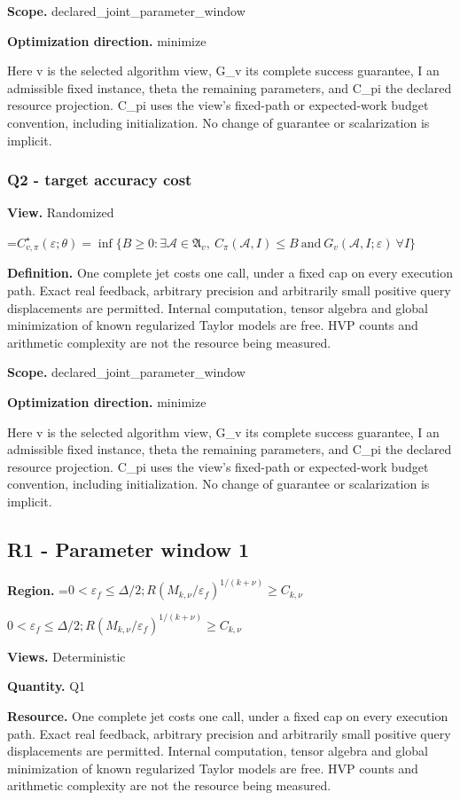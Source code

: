 \documentclass[10pt,a4paper]{article}
\newcommand{\AtlasMath}[1]{\par\begingroup\centering\setbox0=\hbox{$\displaystyle #1$}\ifdim\wd0>1.4\linewidth\typeout{ATLAS WIDE FORMULA: \the\wd0}\fi\ifdim\wd0>\linewidth\resizebox{\linewidth}{!}{\box0}\else\box0\fi\par\endgroup}
\newcommand{\AtlasInlineMath}[1]{\begingroup\setbox0=\hbox{$#1$}\ifdim\wd0>.4\linewidth\endgroup\AtlasMath{#1}\else\endgroup$#1$\fi}
\begin{document}
\textbf{Scope.} declared\_joint\_parameter\_window

\textbf{Optimization direction.} minimize

Here v is the selected algorithm view, G\_v its complete success guarantee, I an admissible fixed instance, theta the remaining parameters, and C\_pi the declared resource projection. C\_pi uses the view's fixed-path or expected-work budget convention, including initialization. No change of guarantee or scalarization is implicit.

\subsubsection{Q2 - target accuracy cost}
\textbf{View.} Randomized

\AtlasMath{C^\star_{v,\pi}(\varepsilon;\theta)=\inf\{B\ge0:\exists\mathcal A\in\mathfrak A_v,\ C_\pi(\mathcal A,I)\le B\ \text{and}\ G_v(\mathcal A,I;\varepsilon)\ \forall I\}}
\textbf{Definition.} One complete jet costs one call, under a fixed cap on every execution path. Exact real feedback, arbitrary precision and arbitrarily small positive query displacements are permitted. Internal computation, tensor algebra and global minimization of known regularized Taylor models are free. HVP counts and arithmetic complexity are not the resource being measured.

\textbf{Scope.} declared\_joint\_parameter\_window

\textbf{Optimization direction.} minimize

Here v is the selected algorithm view, G\_v its complete success guarantee, I an admissible fixed instance, theta the remaining parameters, and C\_pi the declared resource projection. C\_pi uses the view's fixed-path or expected-work budget convention, including initialization. No change of guarantee or scalarization is implicit.

\subsection{R1 - Parameter window 1}
\textbf{Region.} \AtlasInlineMath{0<\varepsilon_f\le \Delta/2;R(M_{k,\nu}/\varepsilon_f)^{1/(k+\nu)}\ge C_{k,\nu}}

\textbf{Views.} Deterministic

\textbf{Quantity.} Q1

\textbf{Resource.} One complete jet costs one call, under a fixed cap on every execution path. Exact real feedback, arbitrary precision and arbitrarily small positive query displacements are permitted. Internal computation, tensor algebra and global minimization of known regularized Taylor models are free. HVP counts and arithmetic complexity are not the resource being measured.
\end{document}
